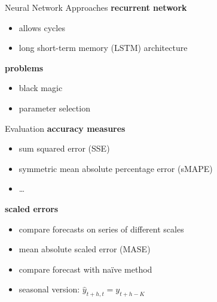 \documentclass{beamer}
\begin{document}
  
  \begin{frame}{Neural Network Approaches}
    \textbf{recurrent network}
    \begin{itemize}
     \item allows cycles	
     \item long short-term memory (LSTM) architecture
     
    \end{itemize}

    
    \textbf{problems}
    \begin{itemize}
     \item black magic
     \item parameter selection
    \end{itemize}

  \end{frame}

  
  \begin{frame}{Evaluation}
    \textbf{accuracy measures}
    \begin{itemize}
     \item sum squared error (SSE)
     \item symmetric mean absolute percentage error (sMAPE)
     \item \ldots
    \end{itemize}
   
    \textbf{scaled errors}
    \begin{itemize}
     \item compare forecasts on series of different scales 
     \item mean absolute scaled error (MASE)
     \item compare forecast with naïve method 
     \item seasonal version: \(\hat{y}_{t+h,t} = y_{t+h-K}\) %
    \end{itemize}
  \end{frame}

  
  
\end{document}
